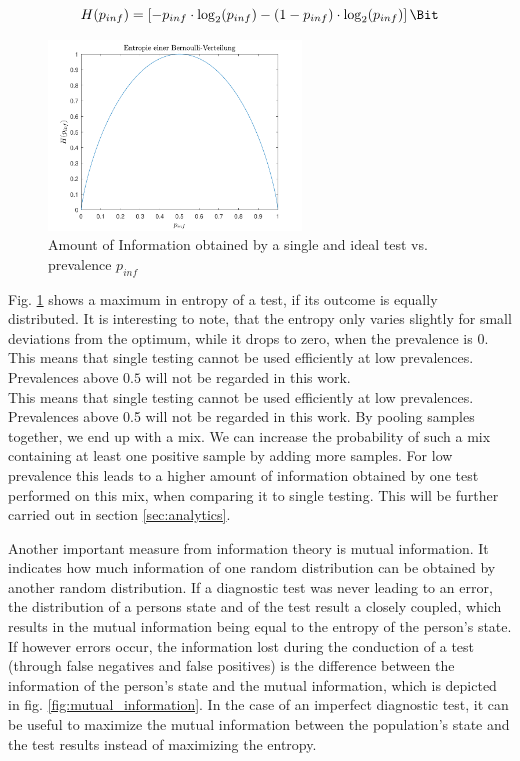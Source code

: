 \documentclass[fleqn,10pt]{wlscirep}
\begin{document}
	\begin{ceqn}
		\begin{equation}
		H(p_{inf}) = \left[-p_{inf} \cdot \log_2(p_{inf})-(1-p_{inf}) \cdot \log_2(p_{inf})\right] \si{\Bit}
		\end{equation}
	\end{ceqn}
	
	\begin{figure}[ht]
		\centering
		\includegraphics[width=0.6\textwidth]{pics/Bin_Entropie.pdf}
		\caption{Amount of Information obtained by a single and ideal test vs. prevalence $p_{inf}$}
		\label{fig:bin_entropie}
	\end{figure}
	
	Fig. \ref{fig:bin_entropie} shows a maximum in entropy of a test, if its outcome is equally distributed. It is interesting to note, that the entropy only varies slightly for small deviations from the optimum, while it drops to zero, when the prevalence is $0$. This means that single testing cannot be used efficiently at low prevalences. Prevalences above $0.5$ will not be regarded in this work.\\
	
	This means that single testing cannot be used efficiently at low prevalences. Prevalences above 0.5 will not be regarded in this work. By pooling samples together, we end up with a mix. We can increase the probability of such a mix containing at least one positive sample by adding more samples. For low prevalence this leads to a higher amount of information obtained by one test performed on this mix, when comparing it to single testing.
	This will be further carried out in section \ref{sec:analytics}.
	
	
	Another important measure from information theory is mutual information. It indicates how much information of one random distribution can be obtained by another random distribution. If a diagnostic test was never leading to an error, the distribution of a persons state and of the test result a closely coupled, which results in the mutual information being equal to the entropy of the person's state. If however errors occur, the information lost during the conduction of a test (through false negatives and false positives) is the difference between the information of the person's state and the mutual information, which is depicted in fig. \ref{fig:mutual_information}. In the case of an imperfect diagnostic test, it can be useful to maximize the mutual information between the population's state and the test results instead of maximizing the entropy.\\
	
\end{document}
